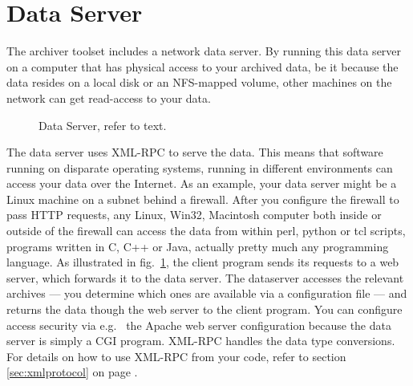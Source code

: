 \section{Data Server} \label{sec:dataserver}
The archiver toolset includes a network data server.
By running this data server on a computer that has
physical access to your archived data, be it because the data resides
on a local disk or an NFS-mapped volume, other machines
on the network can get read-access to your data.

\begin{figure}[htb]
\begin{center}
\end{center}
\caption{\label{fig:dataserver}Data Server, refer to text.}
\end{figure}

\noindent The data server uses XML-RPC to serve the data. This means that
software running on disparate operating systems, running in different
environments can access your data over the Internet. As an example,
your data server might be a Linux machine on a subnet behind a
firewall. After you configure the firewall to pass HTTP requests, any
Linux, Win32, Macintosh computer both inside or outside of the
firewall can access the data from within perl, python or tcl scripts,
programs written in C, C++ or Java, actually pretty much any programming
language. As illustrated in fig.~\ref{fig:dataserver}, the client
program sends its requests to a web server, which forwards it to the
data server. The dataserver accesses the relevant archives --- you
determine which ones are available via a configuration file --- and
returns the data though the web server to the client program.  You can
configure access security via e.g.~ the Apache web server
configuration because the data server is simply a CGI program.
XML-RPC handles the data type conversions. For details on how to use
XML-RPC from your code, refer to section \ref{sec:xmlprotocol} on page
\pageref{sec:xmlprotocol}.

